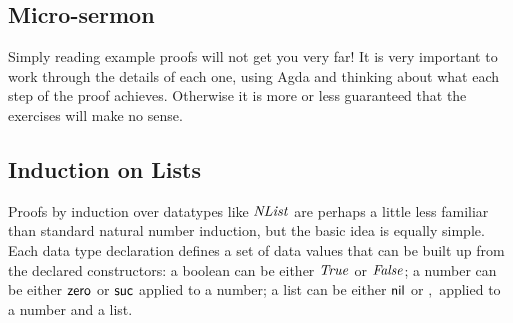 \documentclass{book}
\newcommand{\D}[1]{\blue{\mathsf{#1}}}
\newcommand{\F}[1]{\green{\mathsf{#1}}}
\newcommand{\V}[1]{\purple{\mathit{#1}}}
\begin{document}
\subsection{Micro-sermon}

Simply reading example proofs will not get you very far! It is very important to work 
through the details of each one, using Agda and thinking about what each step of the 
proof achieves. Otherwise it is more or less guaranteed that the exercises will make no sense.

\subsection{Induction on Lists}

Proofs by induction over datatypes like \ensuremath{\V{NList}} are perhaps a little less familiar than standard 
natural number induction, but the basic idea is equally simple. Each data type declaration defines 
a set of data values that can be built up from the declared constructors: a boolean can be either 
\ensuremath{\V{True}} or \ensuremath{\V{False}}; a number can be either \ensuremath{\F{zero}} or \ensuremath{\F{suc}} applied to a number; a list can be 
either \ensuremath{\D{nil}} or \ensuremath{,} applied to a number and a list.
\end{document}
